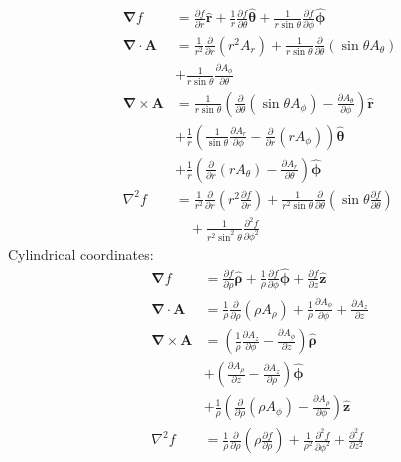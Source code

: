 \documentclass[10pt,twocolumn]{article}
\newcommand{\D}{\mathbf{\nabla}}
\newcommand{\A}{\mathbf{A}}
\newcommand{\laplacian}{\nabla^2}
\newcommand{\zhat}{\mathbf{\hat{z}}}
\newcommand{\rhat}{\mathbf{\hat{r}}}
\newcommand{\thetahat}{\mathbf{\hat{\theta}}}
\newcommand{\rhohat}{\mathbf{\hat{\rho}}}
\newcommand{\phihat}{\mathbf{\hat{\phi}}}
\begin{document}
  \begin{align*}
    \D f &= \frac{\partial f}{\partial r}\rhat
    + \frac1r\frac{\partial f}{\partial\theta}\thetahat
    + \frac1{r\sin\theta}\frac{\partial f}{\partial\phi}\phihat \\
    \D\cdot\A &= \frac1{r^2}\frac{\partial}{\partial r}
          \left(r^2A_r\right)
    + \frac1{r\sin\theta}\frac{\partial}{\partial\theta}
          \left(\sin\theta A_\theta\right) \\
    &+ \frac1{r\sin\theta}\frac{\partial A_\phi}{\partial\theta} \\
    \D\times\A &=
    \frac1{r\sin\theta} \left(
         \frac{\partial}{\partial\theta}\left(\sin\theta A_\phi\right)
         - \frac{\partial A_\theta}{\partial\phi}
    \right) \rhat \\
    &+ \frac1r\left(
         \frac1{\sin\theta}\frac{\partial A_r}{\partial \phi}
         - \frac{\partial}{\partial r}\left(rA_\phi\right)
    \right)\thetahat \\
    &+ \frac1r\left(
         \frac{\partial}{\partial r}\left(rA_\theta\right)
         -\frac{\partial A_r}{\partial\theta}
    \right)\phihat
    \\
    \laplacian f &=
    \frac1{r^2}\frac{\partial}{\partial r}\left(r^2\frac{\partial
    f}{\partial r}\right)
    + \frac1{r^2\sin\theta}\frac{\partial}{\partial\theta}
      \left(\sin\theta\frac{\partial f}{\partial\theta}\right)\\
    &\quad+ \frac1{r^2\sin^2\theta}\frac{\partial^2f}{\partial\phi^2}
  \end{align*}
  Cylindrical coordinates:
  \begin{align*}
    \D f &= \frac{\partial f}{\partial\rho}\rhohat
    + \frac1\rho \frac{\partial f}{\partial\phi} \phihat
    + \frac{\partial f}{\partial z}\zhat\\
    \D\cdot\A &=
    \frac1\rho \frac{\partial}{\partial\rho}\left(\rho A_\rho\right)
    + \frac1\rho \frac{\partial A_\phi}{\partial\phi}
    + \frac{\partial A_z}{\partial z} \\
    \D\times\A &= \left(\frac1\rho\frac{\partial A_z}{\partial\phi}
                  - \frac{\partial A_\phi}{\partial z}\right)\rhohat \\
    &+ \left(\frac{\partial A_\rho}{\partial z} -
             \frac{\partial A_z}{\partial\rho}\right)\phihat \\
    &+ \frac1\rho\left(\frac{\partial}{\partial\rho}(\rho A_\phi) -
                \frac{\partial A_\rho}{\partial\phi} \right)\zhat \\
    \laplacian f &=
    \frac1\rho\frac{\partial}{\partial\rho}
    \left(\rho\frac{\partial f}{\partial\rho}\right)
    + \frac1{\rho^2}\frac{\partial^2f}{\partial\phi^2}
    + \frac{\partial^2f}{\partial z^2}
  \end{align*}
\end{document}
